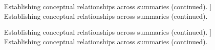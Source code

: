 
\begin{table}
    \centering
    \caption
    [
        Establishing conceptual relationships across summaries (continued).
    ]
    {
        Establishing conceptual relationships across summaries (continued).
    }
    \label{table:sum-tab-3}
    \centering
\end{table}



\begin{table}
    \centering
    \caption
    [
        Establishing conceptual relationships across summaries (continued).
    ]
    {
        Establishing conceptual relationships across summaries (continued).
    }
    \label{table:sum-tab-4}
    \centering
\end{table}





